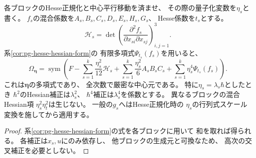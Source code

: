 \begin{corollary}[一般次元での全方向の有限Hessian公式]
\label{cor:pg-ad-hessian}
各ブロックのHesse正規化と中心平行移動を済ませ、
その際の量子化変数を$\eta_s$と書く。
$f_s$の混合係数を$A_s,B_s,C_s,D_s,E_s,H_s,G_s$、
Hesse係数を$t_s$とする。
\begin{equation}
 {\mathscr H}_s=
 \det\left(\frac{\partial^2 f_s}
 {\partial x_{si}\partial x_{sj}}\right)_{i,j=1}^3.
\end{equation}
系\ref{cor:pg-hesse-hessian-form}の
有限多項式$\Psi_{t_s}(f_s)$を用いると、
\begin{equation}
 \boxed{\quad
 \Omega_{\boldsymbol\eta}=
 \operatorname{sym}\left(
 F-\sum_{s=1}^k\frac{\eta_s^2}{12}{\mathscr H}_s
 +\sum_{s=1}^k\frac{\eta_s^2}{6}A_sB_sC_s
 +\sum_{s=1}^k\eta_s^4\Psi_{t_s}(f_s)
 \right).
 \quad}
 \label{eq:pg-ad-hessian-center}
\end{equation}
これは$\boldsymbol\eta$の多項式であり、
全次数で厳密な中心元である。
特に$\eta_s=\lambda_s\hbar$としたとき
$\hbar^2$のHessian補正は$\lambda_s^2$、
$\hbar^4$補正は$\lambda_s^4$を係数とする。
異なるブロックの混合Hessian項
$\eta_s^2\eta_t^2$は生じない。
一般の$g_s$へはHesse正規化時の
$\eta_s$の行列式スケール変換を施してから適用する。
\end{corollary}
\begin{proof}
系\ref{cor:pg-hesse-hessian-form}の式を各ブロックに用いて
和を取れば得られる。
各補正は$x_s,u$にのみ依存し、
他ブロックの生成元と可換なため、
高次の交叉補正を必要としない。
\end{proof}

